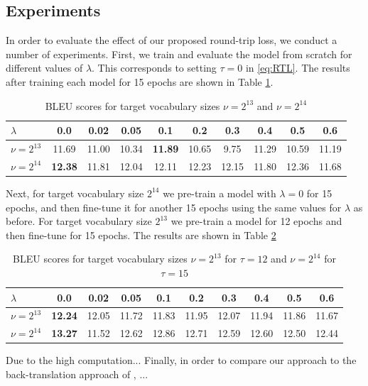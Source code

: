\documentclass[11pt,a4paper]{article}
\begin{document}
\subsection{Experiments}
In order to evaluate the effect of our proposed round-trip loss, we conduct a number of experiments. First, we train and evaluate the model from scratch for different values of $\lambda$. This corresponds to setting $\tau=0$ in \eqref{eq:RTL}. The results after training each model for 15 epochs are shown in Table \ref{tab:result1}.
\begin{table} [ht]
\centering
\small
\begin{tabular}{ l || c | c | c | c | c | c | c | c | c  }
  $\lambda$ & 0.0 & 0.02 & 0.05 & 0.1 & 0.2 & 0.3 & 0.4 & 0.5 & 0.6 \\ \hline
  $\nu=2^{13}$ & 11.69 & 11.00 & 10.34 & \textbf{11.89} & 10.65 & 9.75 & 11.29 & 10.59 & 11.19 \\
  $\nu=2^{14}$ & \textbf{12.38} & 11.81 & 12.04 & 12.11 & 12.23 & 12.15 & 11.80 & 12.36 & 11.68 \\
\end{tabular}
\caption{BLEU scores for target vocabulary sizes $\nu=2^{13}$ and $\nu=2^{14}$}
\label{tab:result1}
\end{table}

Next, for target vocabulary size $2^{14}$ we pre-train a model with $\lambda=0$ for 15 epochs, and then fine-tune it for another 15 epochs using the same values for $\lambda$ as before. For target vocabulary size $2^{13}$ we pre-train a model for 12 epochs and then fine-tune for 15 epochs. The results are shown in Table \ref{tab:result2}
\begin{table} [ht]
\centering
\small
\begin{tabular}{ l || c | c | c | c | c | c | c | c | c  }
  $\lambda$ & 0.0 & 0.02 & 0.05 & 0.1 & 0.2 & 0.3 & 0.4 & 0.5 & 0.6 \\ \hline
  $\nu=2^{13}$ & \textbf{12.24} & 12.05 & 11.72 & 11.83 & 11.95 & 12.07 & 11.94 & 11.86 & 11.67 \\
  $\nu=2^{14}$ & \textbf{13.27} & 11.52 & 12.62 & 12.86 & 12.71 & 12.59 & 12.60 & 12.50 & 12.44 \\
\end{tabular}
\caption{BLEU scores for target vocabulary sizes $\nu=2^{13}$ for $\tau=12$ and $\nu=2^{14}$ for $\tau=15$}
\label{tab:result2}
\end{table}

Due to the high computation...
Finally, in order to compare our approach to the back-translation approach of \citet{backtrans}, ...
\end{document}
